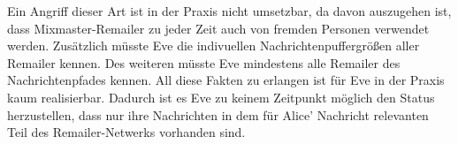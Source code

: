 Ein Angriff dieser Art ist in der Praxis nicht umsetzbar, da davon auszugehen ist, dass Mixmaster-Remailer zu jeder Zeit auch von fremden Personen verwendet werden. Zusätzlich müsste Eve die indivuellen Nachrichtenpuffergrößen aller Remailer kennen. Des weiteren müsste Eve mindestens alle Remailer des Nachrichtenpfades kennen. All diese Fakten zu erlangen ist für Eve in der Praxis kaum realisierbar. Dadurch ist es Eve zu keinem Zeitpunkt möglich den Status herzustellen, dass nur ihre Nachrichten in dem für Alice' Nachricht relevanten Teil des Remailer-Netwerks vorhanden sind.